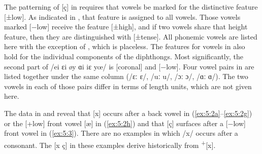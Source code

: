 The patterning of [ç] in  requires that vowels be marked for the distinctive feature [±low]. As indicated in , that feature is assigned to all vowels. Those vowels marked [−low] receive the feature [±high], and if two vowels share that height feature, then they are distinguished with [±tense]. All phonemic vowels are listed here with the exception of , which is placeless. The features for vowels in  also hold for the individual components of the diphthongs. Most significantly, the second part of /ei ɛi øy ɑi iɛ yœ/ is [coronal] and [−low]. Four vowel pairs in  are listed together under the same column (/ɛː ɛ/, /uː u/, /ɔː ɔ/, /ɑː ɑ/). The two vowels in each of those pairs differ in terms of length units, which are not given here.

\begin{table}
\caption{Distinctive features for vowels (Rhoden)\label{tab:5:2}}
\end{table}

The data in  and  reveal that [x] occurs after a back vowel in (\ref{ex:5:2a}--\ref{ex:5:2g}) or the [+low] front vowel [æ] in (\ref{ex:5:2h}) and that [ç] surfaces after a [−low] front vowel in (\ref{ex:5:3}). There are no examples in which /x/ occurs after a consonant. The [x ç] in these examples derive historically from  \textsuperscript{+}[x].

